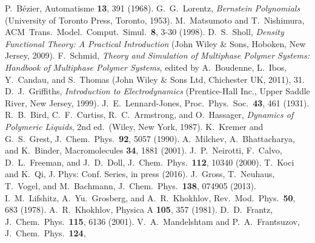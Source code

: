 %
P.~B{\'e}zier, Automatisme  \textbf{13}, 391 (1968).
%
G.~G.~Lorentz, \emph{Bernstein Polynomials} (University of Toronto Press, Toronto, 1953).
%
M.~Matsumoto and T.~Nishimura, ACM\ Trans.\ Model.\ Comput.\ Simul.\ \textbf{8}, 3-30 (1998).
%
%
%
D.~S.~Sholl, \emph{Density Functional Theory: A Practical Introduction} (John Wiley \& Sons, Hoboken, New Jersey, 2009).
%
F.~Schmid, \emph{Theory and Simulation of Multiphase Polymer Systems:
Handbook of Multiphase Polymer Systems}, edited by A.~Boudenne, L.~Ibos,
Y.~Candau, and S.~Thomas (John Wiley \& Sons Ltd, Chichester UK, 2011), 31.
%
D.~J.~Griffiths, \emph{Introduction to Electrodynamics} (Prentice-Hall Inc., Upper Saddle River, New Jersey, 1999).
%
%
J.~E.~Lennard-Jones, Proc.\ Phys.\ Soc.\  \textbf{43}, 461 (1931).
%
%
R.~B.\ Bird, C.~F.\ Curtiss, R.~C.\ Armstrong, and O.~Hassager,
\emph{Dynamics of Polymeric Liquids}, 2nd ed.\ (Wiley, New York,
1987).
%
K.~Kremer and G.~S.\ Grest, J.~Chem.\ Phys.\ \textbf{92}, 5057 (1990).
%
A.~Milchev, A.~Bhattacharya, and K.~Binder, Macromolecules \textbf{34},
1881 (2001).
%
J.~P.~Neirotti, F.~Calvo, D.~L.~Freeman, and J.~D.~Doll, J.~Chem.\ Phys.\ \textbf{112}, 10340 (2000).
%
T.~Koci and K.~Qi, J. Phys: Conf. Series, in press (2016).
%
%
%
J.~Gross, T.~Neuhaus, T.~Vogel, and M.~Bachmann, J.~Chem.\ Phys.\
\textbf{138}, 074905 (2013).
%
%
I.~M.\ Lifshitz, A.~Yu.\ Grosberg, and A.~R.\ Khokhlov, Rev.\ Mod.\
Phys.\ \textbf{50}, 683 (1978).
%
A.~R.\ Khokhlov, Physica A \textbf{105}, 357 (1981).
%
D.~D.\ Frantz, J.~Chem.\ Phys.\ \textbf{115}, 
6136 (2001).
%
V.~A.\ Mandelshtam and P.~A.\ Frantsuzov, J.~Chem.\ Phys.\ \textbf{124}, 
